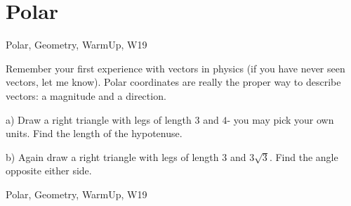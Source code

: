 \section{Polar}

\begin{tagblock}{Polar, Geometry, WarmUp, W19}
\begin{question}
	Remember your first experience with vectors in physics (if you have never seen vectors, let me know). Polar coordinates are really the proper way to describe vectors: a magnitude and a direction. 

\bigskip

a) Draw a right triangle with legs of length $3$ and $4$- you may pick your own units. Find the length of the hypotenuse.

\bigskip

b) Again draw a right triangle with legs of length $3$ and $3\sqrt{3}$. Find the angle opposite either side. 
	
	
\begin{tags}
	    Polar, Geometry, WarmUp, W19
\end{tags}
	
\begin{diary}
\end{diary}
	
\begin{solution}
	   
\end{solution}
	
\end{question}

\end{tagblock}



